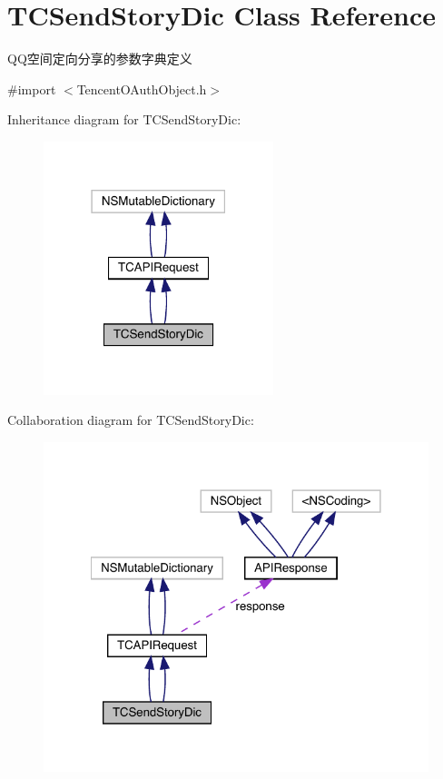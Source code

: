 \hypertarget{interface_t_c_send_story_dic}{}\section{T\+C\+Send\+Story\+Dic Class Reference}
\label{interface_t_c_send_story_dic}


Q\+Q空间定向分享的参数字典定义  




{\ttfamily \#import $<$Tencent\+O\+Auth\+Object.\+h$>$}



Inheritance diagram for T\+C\+Send\+Story\+Dic\+:\nopagebreak
\begin{figure}[H]
\begin{center}
\leavevmode
\includegraphics[width=190pt]{interface_t_c_send_story_dic__inherit__graph}
\end{center}
\end{figure}


Collaboration diagram for T\+C\+Send\+Story\+Dic\+:\nopagebreak
\begin{figure}[H]
\begin{center}
\leavevmode
\includegraphics[width=322pt]{interface_t_c_send_story_dic__coll__graph}
\end{center}
\end{figure}
